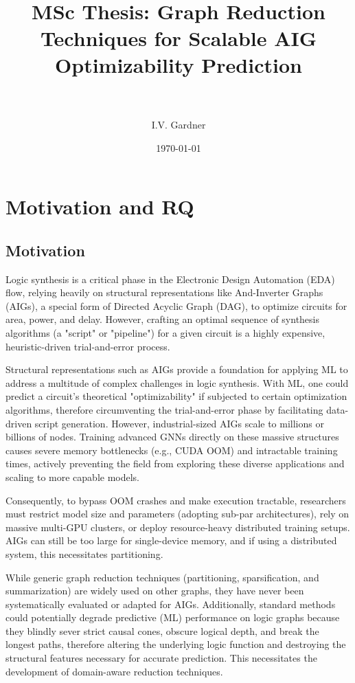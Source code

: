 \documentclass[paper=a4, fontsize=11pt]{scrartcl} %
\title{	
\normalfont \normalsize 
\textsc{} \\ [25pt] %
\horrule{0.5pt} \\[0.4cm] %
\huge MSc Thesis: Graph Reduction Techniques for Scalable AIG Optimizability Prediction \\ %
\horrule{2pt} \\[0.5cm] %
}
\author{I.V. Gardner} %
\date{\normalsize\today} %
\numberwithin{equation}{section} %
\numberwithin{figure}{section} %
\numberwithin{table}{section} %
\begin{document}
\maketitle %

\section{Motivation and RQ}
\subsection{Motivation}
Logic synthesis is a critical phase in the Electronic Design Automation (EDA) flow, relying heavily on structural representations like And-Inverter Graphs (AIGs), a special form of Directed Acyclic Graph (DAG), to optimize circuits for area, power, and delay. However, crafting an optimal sequence of synthesis algorithms (a "script" or "pipeline") for a given circuit is a highly expensive, heuristic-driven trial-and-error process. 

Structural representations such as AIGs provide a foundation for applying ML to address a multitude of complex challenges in logic synthesis. With ML, one could predict a circuit's theoretical "optimizability" if subjected to certain optimization algorithms, therefore circumventing the trial-and-error phase by facilitating data-driven script generation. However, industrial-sized AIGs scale to millions or billions of nodes. Training advanced GNNs directly on these massive structures causes severe memory bottlenecks (e.g., CUDA OOM) and intractable training times, actively preventing the field from exploring these diverse applications and scaling to more capable models. 

Consequently, to bypass OOM crashes and make execution tractable, researchers must restrict model size and parameters (adopting sub-par architectures), rely on massive multi-GPU clusters, or deploy resource-heavy distributed training setups.  AIGs can still be too large for single-device memory, and if using a distributed system, this necessitates partitioning. 


While generic graph reduction techniques (partitioning, sparsification, and summarization) are widely used on other graphs, they have never been systematically evaluated or adapted for AIGs. Additionally, standard methods could potentially degrade predictive (ML) performance on logic graphs because they blindly sever strict causal cones, obscure logical depth, and break the longest paths, therefore altering the underlying logic function and destroying the structural features necessary for accurate prediction. This necessitates the development of domain-aware reduction techniques.
\end{document}
